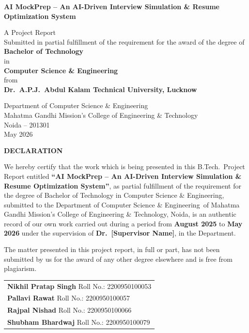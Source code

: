 \documentclass[12pt,a4paper,oneside]{report}
\newcommand{\projecttitle}{AI MockPrep -- An AI-Driven Interview Simulation \& Resume Optimization System}
\newcommand{\dept}{Computer Science \& Engineering}
\newcommand{\college}{Mahatma Gandhi Mission's College of Engineering \& Technology}
\newcommand{\university}{Dr.\ A.P.J.\ Abdul Kalam Technical University, Lucknow}
\newcommand{\submissiondate}{May 2026}
\begin{document}
\newpage
\thispagestyle{empty}
\begin{center}
\vspace*{1cm}
{\Large\bfseries \projecttitle}
\vspace{2cm}

{\large A Project Report\\[6pt]
Submitted in partial fulfillment of the requirement for the award of the degree of\\[6pt]
\textbf{Bachelor of Technology}\\[6pt]
in\\[6pt]
\textbf{\dept}\\[6pt]
from\\[6pt]
\textbf{\university}}

\vfill
{\large Department of \dept\\
\college\\
Noida -- 201301\\[12pt]
\submissiondate}
\end{center}

\newpage
\begin{center}
{\Large\bfseries DECLARATION}
\end{center}
\vspace{1cm}

We hereby certify that the work which is being presented in this B.Tech.\ Project Report entitled \textbf{``\projecttitle''}, as partial fulfillment of the requirement for the degree of Bachelor of Technology in \dept, submitted to the Department of \dept\ of \college, Noida, is an authentic record of our own work carried out during a period from \textbf{August 2025} to \textbf{May 2026} under the supervision of \textbf{Dr.\ [Supervisor Name]}, in the Department.

\vspace{0.5cm}
The matter presented in this project report, in full or part, has not been submitted by us for the award of any other degree elsewhere and is free from plagiarism.

\vspace{1.5cm}
\begin{tabular}{l}
\textbf{Nikhil Pratap Singh} \quad Roll No.: 2200950100053 \\[12pt]
\textbf{Pallavi Rawat} \quad\quad\quad\: Roll No.: 2200950100057 \\[12pt]
\textbf{Rajpal Nishad} \quad\quad\quad Roll No.: 2200950100066 \\[12pt]
\textbf{Shubham Bhardwaj} \quad Roll No.: 2200950100079 \\
\end{tabular}
\end{document}
